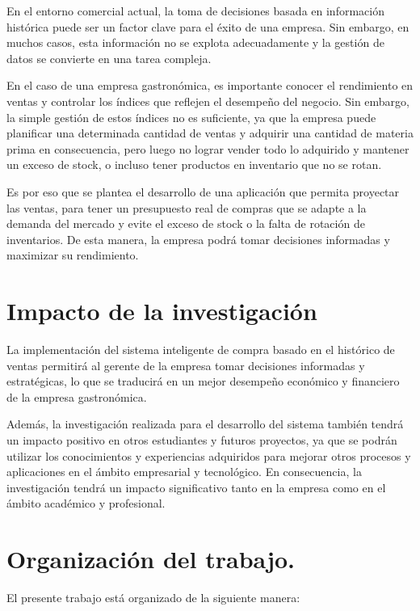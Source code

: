 En el entorno comercial actual, la toma de decisiones basada en información histórica puede ser un factor clave para el éxito de una empresa. Sin embargo, en muchos casos, esta información no se explota adecuadamente y la gestión de datos se convierte en una tarea compleja.

En el caso de una empresa gastronómica, es importante conocer el rendimiento en ventas y controlar los índices que reflejen el desempeño del negocio. Sin embargo, la simple gestión de estos índices no es suficiente, ya que la empresa puede planificar una determinada cantidad de ventas y adquirir una cantidad de materia prima en consecuencia, pero luego no lograr vender todo lo adquirido y mantener un exceso de stock, o incluso tener productos en inventario que no se rotan.

Es por eso que se plantea el desarrollo de una aplicación que permita proyectar las ventas, para tener un presupuesto real de compras que se adapte a la demanda del mercado y evite el exceso de stock o la falta de rotación de inventarios. De esta manera, la empresa podrá tomar decisiones informadas y maximizar su rendimiento.



\section{Impacto de la investigación}

La implementación del sistema inteligente de compra basado en el histórico de ventas permitirá al gerente de la empresa tomar decisiones informadas y estratégicas, lo que se traducirá en un mejor desempeño económico y financiero de la empresa gastronómica.

Además, la investigación realizada para el desarrollo del sistema también tendrá un impacto positivo en otros estudiantes y futuros proyectos, ya que se podrán utilizar los conocimientos y experiencias adquiridos para mejorar otros procesos y aplicaciones en el ámbito empresarial y tecnológico. En consecuencia, la investigación tendrá un impacto significativo tanto en la empresa como en el ámbito académico y profesional.






\section{Organización del trabajo.} 
El presente trabajo está organizado de la siguiente manera:

